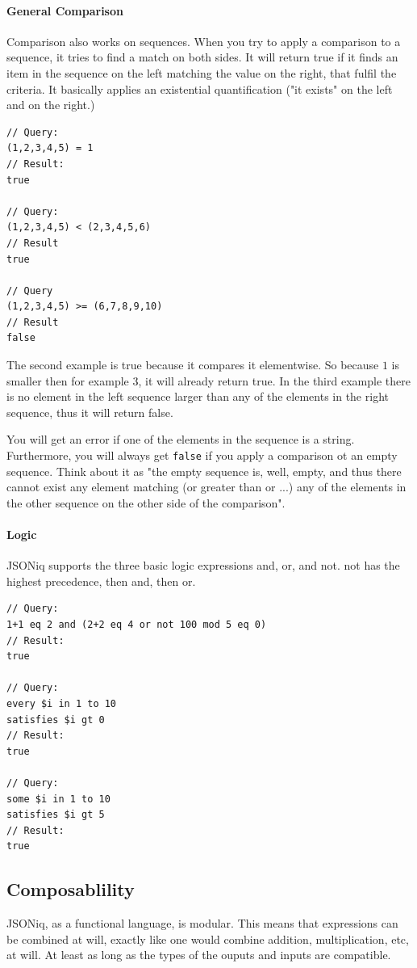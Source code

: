 \paragraph{General Comparison}
Comparison also works on sequences. When you try to apply a comparison to a sequence, it tries to find a match on both sides. It will return true if it finds an item in the sequence on the left matching the value on the right, that fulfil the criteria. It basically applies an existential quantification ("it exists" on the left and on the right.)
\begin{lstlisting}[style=json]
// Query:
(1,2,3,4,5) = 1
// Result:
true

// Query:
(1,2,3,4,5) < (2,3,4,5,6)
// Result
true

// Query
(1,2,3,4,5) >= (6,7,8,9,10)
// Result
false
\end{lstlisting}
The second example is true because it compares it elementwise. So because $1$ is smaller then for example $3$, it will already return true. In the third example there is no element in the left sequence larger than any of the elements in the right sequence, thus it will return false.

You will get an error if one of the elements in the sequence is a string. Furthermore, you will always get \texttt{false} if you apply a comparison ot an empty sequence. Think about it as "the empty sequence is, well, empty, and thus there cannot exist any element matching (or greater than or ...) any of the elements in the other sequence on the other side of the comparison".

\paragraph{Logic}
JSONiq supports the three basic logic expressions and, or, and not. not has the highest precedence, then and, then or.

\begin{lstlisting}[style=json]
// Query:
1+1 eq 2 and (2+2 eq 4 or not 100 mod 5 eq 0)
// Result:
true

// Query:
every $i in 1 to 10
satisfies $i gt 0
// Result:
true

// Query:
some $i in 1 to 10
satisfies $i gt 5
// Result:
true
\end{lstlisting}


\subsection{Composablility}
JSONiq, as a functional language, is modular. This means that expressions can be combined at will, exactly like one would combine addition, multiplication, etc, at will. At least as long as the types of the ouputs and inputs are compatible.

